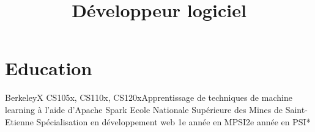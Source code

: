 \documentclass[11pt,a4paper,sans]{moderncv} %
\title{Développeur logiciel}
\begin{document}
\makecvtitle %


\section{Education}

{BerkeleyX} {CS105x, CS110x, CS120x}{Apprentissage de techniques de machine learning à l'aide d'Apache Spark}
{Ecole Nationale Supérieure des Mines de Saint-Etienne} {}{Spécialisation en développement web}
{1e année en MPSI\newline2e année en PSI*}


\end{document}
